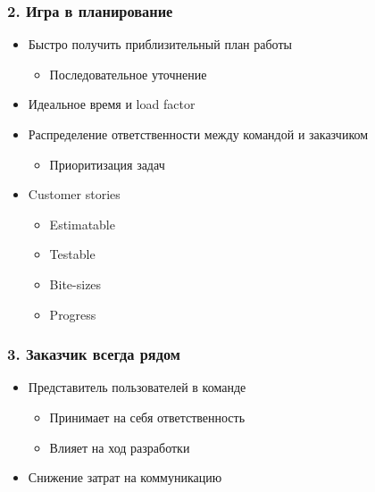 \documentclass{../../slides-style}
\begin{document}
    \begin{frame}
        \frametitle{2. Игра в планирование}
        \begin{itemize}
            \item Быстро получить приблизительный план работы
            \begin{itemize}
                \item Последовательное уточнение
            \end{itemize}
            \item Идеальное время и load factor
            \item Распределение ответственности между командой и заказчиком
            \begin{itemize}
                \item Приоритизация задач
            \end{itemize}
            \item Customer stories
            \begin{itemize}
                \item Estimatable
                \item Testable
                \item Bite-sizes
                \item Progress
            \end{itemize}
        \end{itemize}
    \end{frame}

    \begin{frame}
        \frametitle{3. Заказчик всегда рядом}
        \begin{itemize}
            \item Представитель пользователей в команде
            \begin{itemize}
                \item Принимает на себя ответственность
                \item Влияет на ход разработки
            \end{itemize}
            \item Снижение затрат на коммуникацию
        \end{itemize}
    \end{frame}
\end{document}
